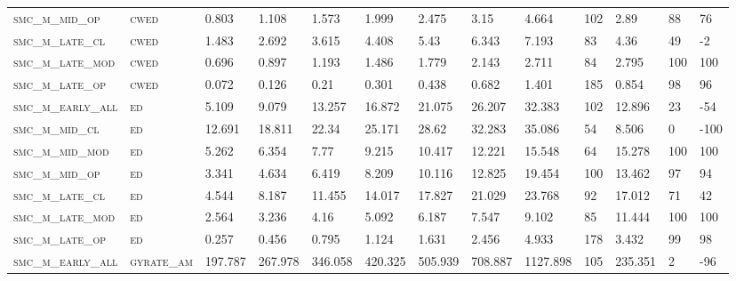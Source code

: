 \begin{landscape}
\begin{center}
\begin{footnotesize}
\begin{longtable}{lllllllllllll}
\textsc{smc\_m\_mid\_op   } & \textsc{cwed      }   & 0.803    & 1.108    & 1.573    & 1.999    & 2.475    & 3.15     & 4.664    & 102    & 2.89          & 88            & 76       \\
\textsc{smc\_m\_late\_cl  } & \textsc{cwed      }   & 1.483    & 2.692    & 3.615    & 4.408    & 5.43     & 6.343    & 7.193    & 83     & 4.36          & 49            & -2       \\
\textsc{smc\_m\_late\_mod } & \textsc{cwed      }   & 0.696    & 0.897    & 1.193    & 1.486    & 1.779    & 2.143    & 2.711    & 84     & 2.795         & 100           & 100      \\
\textsc{smc\_m\_late\_op  } & \textsc{cwed      }   & 0.072    & 0.126    & 0.21     & 0.301    & 0.438    & 0.682    & 1.401    & 185    & 0.854         & 98            & 96       \\
\textsc{smc\_m\_early\_all} & \textsc{ed        }   & 5.109    & 9.079    & 13.257   & 16.872   & 21.075   & 26.207   & 32.383   & 102    & 12.896        & 23            & -54      \\
\textsc{smc\_m\_mid\_cl   } & \textsc{ed        }   & 12.691   & 18.811   & 22.34    & 25.171   & 28.62    & 32.283   & 35.086   & 54     & 8.506         & 0             & -100     \\
\textsc{smc\_m\_mid\_mod  } & \textsc{ed        }   & 5.262    & 6.354    & 7.77     & 9.215    & 10.417   & 12.221   & 15.548   & 64     & 15.278        & 100           & 100      \\
\textsc{smc\_m\_mid\_op   } & \textsc{ed        }   & 3.341    & 4.634    & 6.419    & 8.209    & 10.116   & 12.825   & 19.454   & 100    & 13.462        & 97            & 94       \\
\textsc{smc\_m\_late\_cl  } & \textsc{ed        }   & 4.544    & 8.187    & 11.455   & 14.017   & 17.827   & 21.029   & 23.768   & 92     & 17.012        & 71            & 42       \\
\textsc{smc\_m\_late\_mod } & \textsc{ed        }   & 2.564    & 3.236    & 4.16     & 5.092    & 6.187    & 7.547    & 9.102    & 85     & 11.444        & 100           & 100      \\
\textsc{smc\_m\_late\_op  } & \textsc{ed        }   & 0.257    & 0.456    & 0.795    & 1.124    & 1.631    & 2.456    & 4.933    & 178    & 3.432         & 99            & 98       \\
\textsc{smc\_m\_early\_all} & \textsc{gyrate\_am}   & 197.787  & 267.978  & 346.058  & 420.325  & 505.939  & 708.887  & 1127.898 & 105    & 235.351       & 2             & -96      \\

\end{longtable}
\end{footnotesize}
\end{center}
\end{landscape}
